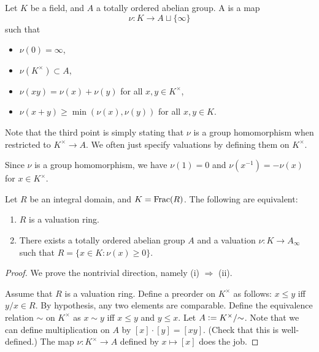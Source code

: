 \documentclass[12pt]{article}
\begin{document}
\begin{defn}
	Let $K$ be a field, and $A$ a totally ordered abelian group. A  is a map
	\begin{equation*} 
		\nu : K \to A \sqcup \{\infty\}
	\end{equation*}
	such that
	\begin{itemize}
		\item $\nu(0) = \infty$,
		\item $\nu(K^{\times}) \subset A$,
		\item $\nu(xy) = \nu(x) + \nu(y)$ for all $x, y \in K^{\times}$,
		\item $\nu(x + y) \ge \min(\nu(x), \nu(y))$ for all $x, y \in K$.
	\end{itemize}
\end{defn}
Note that the third point is simply stating that $\nu$ is a group homomorphism when restricted to $K^{\times} \to A$. We often just specify valuations by defining them on $K^{\times}$.

\begin{obs}
	Since $\nu$ is a group homomorphism, we have $\nu(1) = 0$ and $\nu(x^{-1}) = -\nu(x)$ for $x \in K^{\times}$.
\end{obs}

\begin{prop}
	Let $R$ be an integral domain, and $K = \operatorname{Frac}(R)$. The following are equivalent:
	\begin{enumerate}[label=(\roman*)]
		\item $R$ is a valuation ring.
		\item There exists a totally ordered abelian group $A$ and a valuation $\nu : K \to A_{\infty}$ such that $R = \{x \in K : \nu(x) \ge 0\}$.
	\end{enumerate}
\end{prop}
\begin{proof} 
	We prove the nontrivial direction, namely (i) $\Rightarrow$ (ii).

	Assume that $R$ is a valuation ring. Define a preorder on $K^{\times}$ as follows: $x \le y$ iff $y/x \in R$. By hypothesis, any two elements are comparable. \newline
	Define the equivalence relation $\sim$ on $K^{\times}$ as $x \sim y$ iff $x \le y$ and $y \le x$. \newline
	Let $A \vcentcolon= K^{\times}/{\sim}$. Note that we can define multiplication on $A$ by $[x] \cdot [y] = [xy]$. (Check that this is well-defined.) \newline
	The map $\nu : K^{\times} \to A$ defined by $x \mapsto [x]$ does the job. 
\end{proof}
\end{document}
